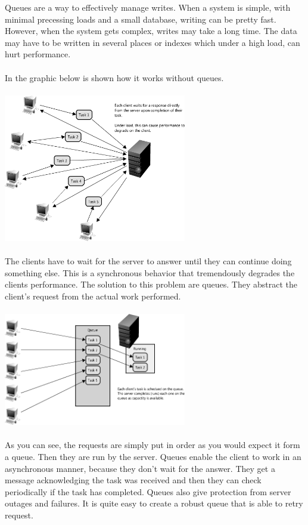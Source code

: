 \documentclass[12p]{article}
\begin{document}
	Queues are a way to effectively manage writes. When a system is simple, with minimal precessing loads and a small database, writing can be pretty fast.  However, when the system gets complex, writes may take a long time. The data may have to be written in several places or indexes which under a high load, can hurt performance. \\\\
	In the graphic below is shown how it works without queues. \\\\
	\includegraphics[width=0.6\textwidth]{img/queue1} \cite{cache} \\\\
	The clients have to wait for the server to answer until they can continue doing something else. This is a synchronous behavior that tremendously degrades the clients performance. The solution to this problem are queues. They abstract the client's request from the actual work performed. \\\\
	\includegraphics[width=0.6\textwidth]{img/queue2} \cite{cache} \\\\
	As you can see, the requests are simply put in order as you would expect it form a queue. Then they are run by the server. Queues enable the client to work in an asynchronous manner, because they don't wait for the answer. They get a message acknowledging the task was received and then they can check periodically if the task has completed. Queues also give protection from server outages and failures. It is quite easy to create a robust queue that is able to retry request. 
\end{document}
